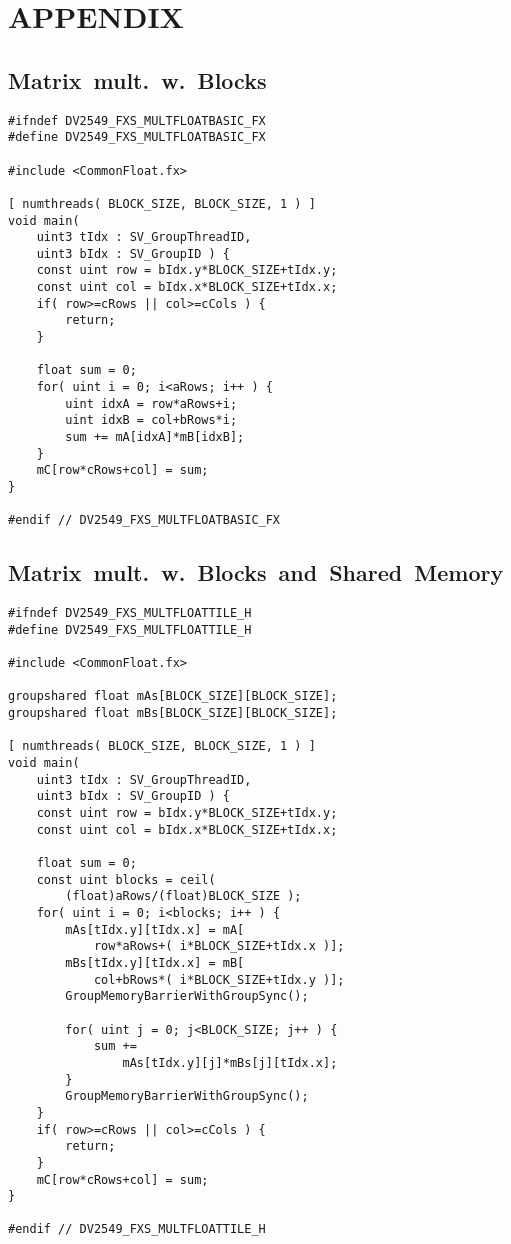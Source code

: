 
\section{APPENDIX}
\label{sec:appendix}

\subsection*{Matrix~mult.~w.~Blocks}
\begin{lstlisting}
#ifndef DV2549_FXS_MULTFLOATBASIC_FX
#define DV2549_FXS_MULTFLOATBASIC_FX

#include <CommonFloat.fx>

[ numthreads( BLOCK_SIZE, BLOCK_SIZE, 1 ) ]
void main(
	uint3 tIdx : SV_GroupThreadID,
	uint3 bIdx : SV_GroupID ) {
	const uint row = bIdx.y*BLOCK_SIZE+tIdx.y;
	const uint col = bIdx.x*BLOCK_SIZE+tIdx.x;
	if( row>=cRows || col>=cCols ) {
		return;
	}
    
	float sum = 0;
	for( uint i = 0; i<aRows; i++ ) {
		uint idxA = row*aRows+i;
		uint idxB = col+bRows*i;
		sum += mA[idxA]*mB[idxB];
	}
	mC[row*cRows+col] = sum;
}

#endif // DV2549_FXS_MULTFLOATBASIC_FX
\end{lstlisting}

\newpage
\vspace*{0.08cm} %

\subsection*{Matrix~mult.~w.~Blocks~and~Shared~Memory}
\begin{lstlisting}
#ifndef DV2549_FXS_MULTFLOATTILE_H
#define DV2549_FXS_MULTFLOATTILE_H

#include <CommonFloat.fx>

groupshared float mAs[BLOCK_SIZE][BLOCK_SIZE];
groupshared float mBs[BLOCK_SIZE][BLOCK_SIZE];

[ numthreads( BLOCK_SIZE, BLOCK_SIZE, 1 ) ]
void main(
	uint3 tIdx : SV_GroupThreadID,
	uint3 bIdx : SV_GroupID ) {
	const uint row = bIdx.y*BLOCK_SIZE+tIdx.y;
	const uint col = bIdx.x*BLOCK_SIZE+tIdx.x;
	
	float sum = 0;
	const uint blocks = ceil( 
		(float)aRows/(float)BLOCK_SIZE );
	for( uint i = 0; i<blocks; i++ ) {
		mAs[tIdx.y][tIdx.x] = mA[ 
			row*aRows+( i*BLOCK_SIZE+tIdx.x )];
		mBs[tIdx.y][tIdx.x] = mB[ 
			col+bRows*( i*BLOCK_SIZE+tIdx.y )];
		GroupMemoryBarrierWithGroupSync();

		for( uint j = 0; j<BLOCK_SIZE; j++ ) {
			sum += 
				mAs[tIdx.y][j]*mBs[j][tIdx.x];
		}
		GroupMemoryBarrierWithGroupSync();
	}
	if( row>=cRows || col>=cCols ) {
		return;
	}
	mC[row*cRows+col] = sum;
}

#endif // DV2549_FXS_MULTFLOATTILE_H

\end{lstlisting}

